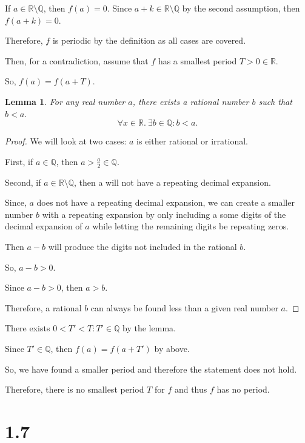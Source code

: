 \documentclass{article}
\newtheorem*{lemma}{Lemma}
\begin{document}
If $a \in \mathbb{R} \setminus \mathbb{Q}$, then $f(a) = 0$.
Since $a+k \in \mathbb{R} \setminus \mathbb{Q}$ by the second assumption, then $f(a+k) = 0$.

Therefore, $f$ is periodic by the definition as all cases are covered.

Then, for a contradiction, assume that $f$ has a smallest period $T>0 \in \mathbb{R}$.

So, $f(a) = f(a+T)$.

\begin{lemma}
    For any real number $a$, there exists a rational number $b$ such that $b<a$. 
    \[\forall x \in \mathbb{R}. \ \exists b \in \mathbb{Q} : b<a.\]
\end{lemma}

\begin{proof}
    We will look at two cases: $a$ is either rational or irrational.

    First, if $a \in \mathbb{Q}$, then $a > \frac{a}{2} \in \mathbb{Q}$.
    
    Second, if $a \in \mathbb{R} \setminus \mathbb{Q}$, then a will not have a repeating decimal expansion.

    Since, $a$ does not have a repeating decimal expansion, we can create a smaller number $b$ with a repeating expansion
    by only including a some digits of the decimal expansion of $a$ while letting the remaining digits be repeating zeros.
    
    Then $a-b$ will produce the digits not included in the rational $b$. 

    So, $a-b>0$.

    Since $a-b>0$, then $a>b$.

    Therefore, a rational $b$ can always be found less than a given real number $a$.\qedhere
\end{proof}

There exists $0 < T' < T : T' \in \mathbb{Q}$ by the lemma. 

Since $T' \in \mathbb{Q}$, then $f(a) = f(a+T')$ by above.

So, we have found a smaller period and therefore the statement does not hold.

Therefore, there is no smallest period $T$ for $f$ and thus $f$ has no period.

\section*{1.7}
\end{document}

